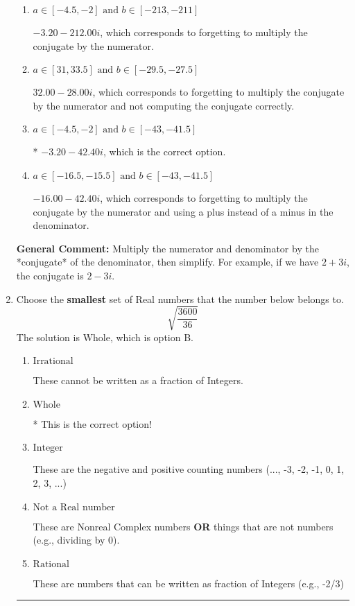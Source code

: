 \documentclass{extbook}[14pt]
\newcommand{\litem}[1]{\item #1

\rule{\textwidth}{0.4pt}}
\begin{document}
\begin{enumerate}
{\begin{enumerate}[label=\Alph*.]
 $18.00  - 88.00 i$, which corresponds to just dividing the first term by the first term and the second by the second.
\item \( a \in [-4.5, -2] \text{ and } b \in [-213, -211] \)

 $-3.20  - 212.00 i$, which corresponds to forgetting to multiply the conjugate by the numerator.
\item \( a \in [31, 33.5] \text{ and } b \in [-29.5, -27.5] \)

 $32.00  - 28.00 i$, which corresponds to forgetting to multiply the conjugate by the numerator and not computing the conjugate correctly.
\item \( a \in [-4.5, -2] \text{ and } b \in [-43, -41.5] \)

* $-3.20  - 42.40 i$, which is the correct option.
\item \( a \in [-16.5, -15.5] \text{ and } b \in [-43, -41.5] \)

 $-16.00  - 42.40 i$, which corresponds to forgetting to multiply the conjugate by the numerator and using a plus instead of a minus in the denominator.
\end{enumerate}

\textbf{General Comment:} Multiply the numerator and denominator by the *conjugate* of the denominator, then simplify. For example, if we have $2+3i$, the conjugate is $2-3i$.
}
\litem{
Choose the \textbf{smallest} set of Real numbers that the number below belongs to.
\[ \sqrt{\frac{3600}{36}} \]The solution is \( \text{Whole} \), which is option B.\begin{enumerate}[label=\Alph*.]
\item \( \text{Irrational} \)

These cannot be written as a fraction of Integers.
\item \( \text{Whole} \)

* This is the correct option!
\item \( \text{Integer} \)

These are the negative and positive counting numbers (..., -3, -2, -1, 0, 1, 2, 3, ...)
\item \( \text{Not a Real number} \)

These are Nonreal Complex numbers \textbf{OR} things that are not numbers (e.g., dividing by 0).
\item \( \text{Rational} \)

These are numbers that can be written as fraction of Integers (e.g., -2/3)
\end{enumerate}

}
\end{enumerate}
\end{document}

